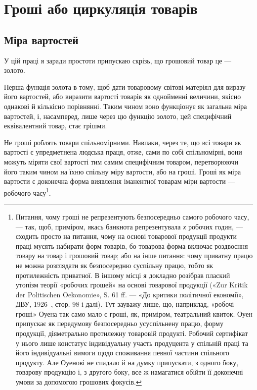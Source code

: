 \section{Гроші або циркуляція товарів}

\subsection{Міра вартостей}

У цій праці я заради простоти припускаю скрізь, що грошовий
товар це — золото.

Перша функція золота в тому, щоб дати товаровому світові
матеріял для виразу його вартостей, або виразити вартості товарів
як однойменні величини, якісно однакові й кількісно порівнянні.
Таким чином воно функціонує як загальна міра вартостей,
і, насамперед, лише через цю функцію золото, цей специфічний
еквівалентний товар, стає грішми.

Не гроші роблять товари спільномірними. Навпаки, через
те, що всі товари як вартості є упредметнена людська праця, отже,
сами по собі спільномірні, вони можуть міряти свої вартості
тим самим специфічним товаром, перетворюючи його таким чином
на їхню спільну міру вартости, або на гроші. Гроші як міра
вартости є доконечна форма виявлення іманентної товарам міри
вартости — робочого часу\footnote{
Питання, чому гроші не репрезентують безпосередньо самого робочого
часу, — так, щоб, приміром, якась банкнота репрезентувала \emph{х} робочих
годин, — сходить просто на питання, чому на основі товарової продукції
продукти праці мусять набирати форм товарів, бо товарова форма
включає роздвоєння товару на товар і грошовий товар; або на інше питання:
чому приватну працю не можна розглядати як безпосередню суспільну
працю, тобто як протилежність приватної. В іншому місці я докладно
розібрав плаский утопізм теорії «робочих грошей» на основі товарової
продукції («Zur Kritik der Politischen Oekonomie», S. 61 ff. — «До критики
політичної економії», ДВУ, 1926~, стор. 98 і далі). Тут зауважу лише,
що, наприклад, «робочі гроші» Оуена так само мало є гроші, як, приміром,
театральний квиток. Оуен припускає як передумову безпосередньо
усуспільнену працю, форму продукції, діяметрально протилежну товаровій
продукті. Робочий сертифікат у нього лише констатує індивідуальну
участь продуцента у спільній праці та його індивідуальні вимоги щодо споживання
певної частини спільного продукту. Але Оуенові не спадало й на
думку припускати, з одного боку, товарову продукцію і, з другого боку, все ж
намагатися обійти її доконечні умови за допомогою грошових фокусів.
}.

